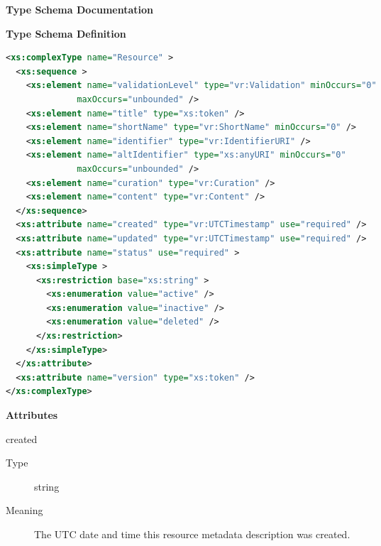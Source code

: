 \documentclass[11pt,a4paper]{ivoa}
\begin{document}
\goodbreak

\begin{generated}
\begingroup
        \renewcommand*\descriptionlabel[1]{%
        \hbox to 5.5em{\emph{#1}\hfil}}\vspace{2ex}\noindent\textbf{ Type Schema Documentation}


\vspace{1ex}\noindent\textbf{ Type Schema Definition}

\begin{lstlisting}[language=XML,basicstyle=\footnotesize]
<xs:complexType name="Resource" >
  <xs:sequence >
    <xs:element name="validationLevel" type="vr:Validation" minOccurs="0"
              maxOccurs="unbounded" />
    <xs:element name="title" type="xs:token" />
    <xs:element name="shortName" type="vr:ShortName" minOccurs="0" />
    <xs:element name="identifier" type="vr:IdentifierURI" />
    <xs:element name="altIdentifier" type="xs:anyURI" minOccurs="0"
              maxOccurs="unbounded" />
    <xs:element name="curation" type="vr:Curation" />
    <xs:element name="content" type="vr:Content" />
  </xs:sequence>
  <xs:attribute name="created" type="vr:UTCTimestamp" use="required" />
  <xs:attribute name="updated" type="vr:UTCTimestamp" use="required" />
  <xs:attribute name="status" use="required" >
    <xs:simpleType >
      <xs:restriction base="xs:string" >
        <xs:enumeration value="active" />
        <xs:enumeration value="inactive" />
        <xs:enumeration value="deleted" />
      </xs:restriction>
    </xs:simpleType>
  </xs:attribute>
  <xs:attribute name="version" type="xs:token" />
</xs:complexType>
\end{lstlisting}

\vspace{0.5ex}\noindent\textbf{ Attributes}

\begingroup\small\begin{bigdescription}
\item[created]
\begin{description}
\item[Type] string
\item[Meaning]
              The UTC date and time this resource metadata description
              was created.


\end{description}
\end{bigdescription}
\end{generated}
\end{document}
